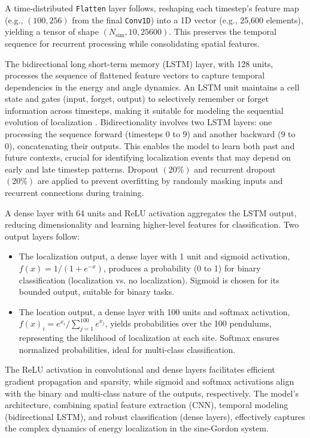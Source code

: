 \documentclass[11pt]{article}
\begin{document}
A time-distributed \texttt{Flatten} layer follows, reshaping each timestep’s feature map (e.g., $(100, 256)$ from the final \texttt{Conv1D}) into a 1D vector (e.g., 25,600 elements), yielding a tensor of shape $(N_{\text{sim}}, 10, 25600)$. This preserves the temporal sequence for recurrent processing while consolidating spatial features.

The bidirectional long short-term memory (LSTM) layer, with 128 units, processes the sequence of flattened feature vectors to capture temporal dependencies in the energy and angle dynamics. An LSTM unit maintains a cell state and gates (input, forget, output) to selectively remember or forget information across timesteps, making it suitable for modeling the sequential evolution of localization \cite{Hochreiter1997}. Bidirectionality involves two LSTM layers: one processing the sequence forward (timesteps 0 to 9) and another backward (9 to 0), concatenating their outputs. This enables the model to learn both past and future contexts, crucial for identifying localization events that may depend on early and late timestep patterns. Dropout $(20\%)$ and recurrent dropout $(20\%)$ are applied to prevent overfitting by randomly masking inputs and recurrent connections during training.

A dense layer with 64 units and ReLU activation aggregates the LSTM output, reducing dimensionality and learning higher-level features for classification. Two output layers follow:
\begin{itemize}
\item The localization output, a dense layer with 1 unit and sigmoid activation, $f(x) = 1 / (1 + e^{-x})$, produces a probability (0 to 1) for binary classification (localization vs. no localization). Sigmoid is chosen for its bounded output, suitable for binary tasks.
\item The location output, a dense layer with 100 units and softmax activation, $f(x)_i = e^{x_i} / \sum_{j=1}^{100} e^{x_j}$, yields probabilities over the 100 pendulums, representing the likelihood of localization at each site. Softmax ensures normalized probabilities, ideal for multi-class classification.
\end{itemize}

The ReLU activation in convolutional and dense layers facilitates efficient gradient propagation and sparsity, while sigmoid and softmax activations align with the binary and multi-class nature of the outputs, respectively. The model’s architecture, combining spatial feature extraction (CNN), temporal modeling (bidirectional LSTM), and robust classification (dense layers), effectively captures the complex dynamics of energy localization in the sine-Gordon system.
\end{document}
